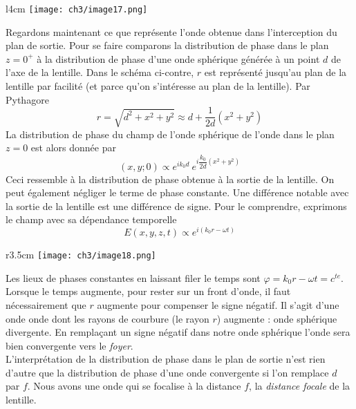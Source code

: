 \newpage
	\begin{wrapfigure}[8]{l}{4cm}
	\texttt{[image: ch3/image17.png]}
	\end{wrapfigure}	
Regardons maintenant ce que représente l'onde obtenue dans l'interception du plan de sortie. Pour se faire 
comparons la distribution de phase dans le plan $z=0^+$ à la distribution de phase d'une onde sphérique 
générée à un point $d$ de l'axe de la lentille. Dans le schéma ci-contre, $r$ est représenté jusqu'au plan 
de la lentille par facilité (et parce qu'on s'intéresse au plan de la lentille). Par Pythagore
\begin{equation}
r = \sqrt{d^2+x^2+y^2} \approx d + \dfrac{1}{2d}\left(x^2+y^2\right)
\end{equation}
La distribution de phase du champ de l'onde sphérique de l'onde dans le plan $z=0$ est alors donnée par
\begin{equation}
(x,y;0) \propto e^{ik_0d}\ e^{i\dfrac{k_0}{2d}(x^2+y^2)}
\end{equation}
Ceci ressemble à la distribution de phase obtenue à la sortie de la lentille. On peut également négliger 
le terme de phase constante. Une différence notable avec la sortie de la lentille est une différence de 
signe. Pour le comprendre, exprimons le champ avec sa dépendance temporelle
\begin{equation}
E(x,y,z,t) \propto e^{i(k_0r-\omega t)}
\end{equation}

	\begin{wrapfigure}[8]{r}{3.5cm}
	\vspace{-5mm}
	\texttt{[image: ch3/image18.png]}
	\end{wrapfigure}
Les lieux de phases constantes en laissant filer le temps sont $\varphi = k_0 r-\omega t = c^{te}$. Lorsque 
le temps augmente, pour rester sur un front d'onde, il faut nécessairement que $r$ augmente pour compenser 
le signe négatif. Il s'agit d'une onde onde dont les rayons de courbure (le rayon $r$) augmente : onde 
sphérique divergente. En remplaçant un signe négatif dans notre onde sphérique l'onde sera bien convergente 
vers le \textit{foyer}.\\

L'interprétation de la distribution de phase dans le plan de sortie n'est rien d'autre que la distribution 
de phase d'une onde convergente si l'on remplace $d$ par $f$. Nous avons une onde qui se focalise à la 
distance $f$, la \textit{distance focale} de la lentille.\\

